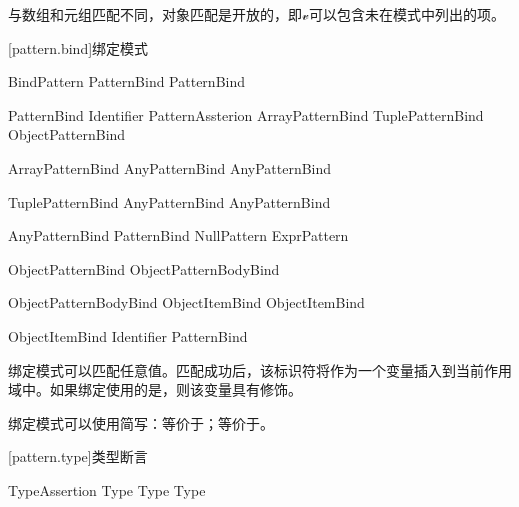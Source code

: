 \pnum
与数组和元组匹配不同，对象匹配是开放的，即$\mathcal{v}$可以包含未在模式中列出的项。

[pattern.bind]{绑定模式}

\begin{bnf}{BindPattern}
     PatternBind\br
     PatternBind
\end{bnf}

\begin{bnf}{PatternBind}
    Identifier PatternAssterion \br
    ArrayPatternBind \br
    TuplePatternBind \br
    ObjectPatternBind
\end{bnf}

\begin{bnf}{ArrayPatternBind}
    \terminal{[} AnyPatternBind \bnflp\terminal{,} AnyPatternBind\bnfrp\bnfs \terminal{]}
\end{bnf}

\begin{bnf}{TuplePatternBind}
    \terminal{(} AnyPatternBind \bnflp\terminal{,} AnyPatternBind\bnfrp\bnfs \terminal{)}
\end{bnf}

\begin{bnf}{AnyPatternBind}
    PatternBind \br
     \br
    NullPattern \br
    ExprPattern
\end{bnf}

\begin{bnf}{ObjectPatternBind}
    \terminal{\{} ObjectPatternBodyBind \terminal{\}}
\end{bnf}

\begin{bnf}{ObjectPatternBodyBind}
    ObjectItemBind \bnflp\terminal{,} ObjectItemBind\bnfrp\bnfs
\end{bnf}

\begin{bnf}{ObjectItemBind}
    Identifier \terminal{:} PatternBind
\end{bnf}

\pnum
绑定模式可以匹配任意值。匹配成功后，该标识符将作为一个变量插入到当前作用域中。如果绑定使用的是，则该变量具有修饰。

\pnum
绑定模式可以使用简写：等价于；等价于\tcode{[let i, _]}。

[pattern.type]{类型断言}

\begin{bnf}{TypeAssertion}
     Type \br
    \terminal{:} Type \br
     Type
\end{bnf}

